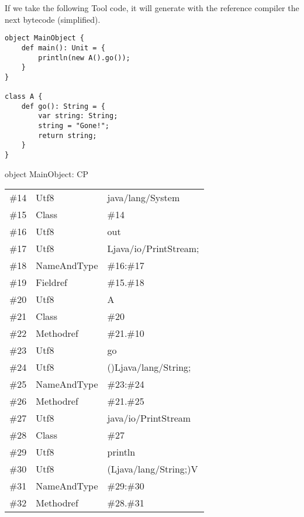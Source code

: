 %
%
%

If we take the following Tool code, it will generate with the reference compiler
the next bytecode (simplified).

\begin{lstlisting}
object MainObject {
	def main(): Unit = {
		println(new A().go());
	}
}

class A {
	def go(): String = {
		var string: String;
		string = "Gone!";
		return string;
	}
}
\end{lstlisting}

object MainObject: CP
\newline
\begin{tabular}{r l l} \hline
	\#14	& Utf8		& java/lang/System	\\
	\#15	& Class		& \#14			\\
	\#16	& Utf8		& out			\\
	\#17	& Utf8		& Ljava/io/PrintStream;	\\
	\#18	& NameAndType	& \#16:\#17		\\
	\#19	& Fieldref	& \#15.\#18		\\
	\#20	& Utf8		& A			\\
	\#21	& Class		& \#20			\\
	\#22	& Methodref	& \#21.\#10		\\
	\#23	& Utf8		& go			\\
	\#24	& Utf8		& ()Ljava/lang/String;	\\
	\#25	& NameAndType	& \#23:\#24		\\
	\#26	& Methodref	& \#21.\#25		\\
	\#27	& Utf8		& java/io/PrintStream	\\
	\#28	& Class		& \#27			\\
	\#29	& Utf8		& println		\\
	\#30	& Utf8		& (Ljava/lang/String;)V	\\
	\#31	& NameAndType	& \#29:\#30		\\
	\#32	& Methodref	& \#28.\#31		\\
\end{tabular}
\newline

